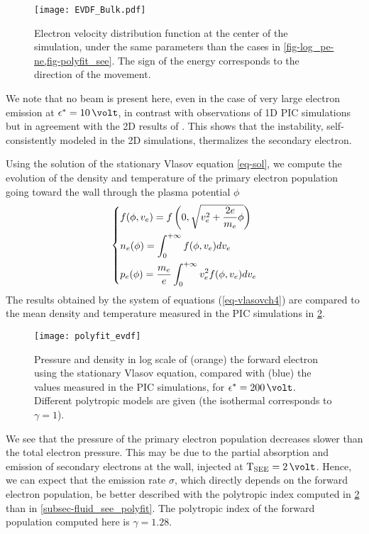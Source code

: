 \begin{figure}[hbt]
  \centering
  \texttt{[image: EVDF\_Bulk.pdf]}
  \caption{Electron velocity distribution function at the center of the simulation, under the same parameters than the cases in \cref{fig-log_pe-ne,fig-polyfit_see}. The sign of the energy corresponds to the direction of the movement.}
  \label{fig-evdf_epsstar}
\end{figure}


We note that no beam is present here, even in the case of very large electron emission at $\crover=10\,\volt$, in contrast with observations of \ac{1D} PIC simulations \citep{sydorenko2006b,sydorenko2007} but in agreement with the \ac{2D} results of \citet{heron2013}.
This shows that the instability, self-consistently modeled in the \ac{2D} simulations, thermalizes the secondary electron.

Using the solution of the stationary Vlasov equation \cref{eq-sol}, we compute the evolution of the density and temperature of the primary electron population going toward the wall through the plasma potential $\phi$ 
\begin{equation} \label{eq-vlasovch4}
  \begin{dcases}
    f(\phi, v_e) = f \left( 0, \sqrt{v_e^2 + \frac{2 e}{m_e} \phi} \right) \\
    n_e(\phi) = \int_0^{+\infty} f(\phi, v_e) dv_e \\
    p_e(\phi) = \frac{m_e}{e} \int_0^{+\infty} v_e^2 f(\phi, v_e) dv_e \\
  \end{dcases}
\end{equation}
The results obtained by the system of equations (\ref{eq-vlasovch4}) are compared to the mean density and temperature measured in the \ac{PIC} simulations in \cref{fig-evdf_polyfit}.

\begin{figure}[hbt]
  \centering
  \texttt{[image: polyfit\_evdf]}
  \caption{Pressure and density in log scale of (orange) the forward electron using the stationary Vlasov equation, compared with (blue) the values measured in the \acs{PIC} simulations, for $\crover=200\,\volt$. Different polytropic models are given (the isothermal corresponds to $\gamma=1$).}
  \label{fig-evdf_polyfit}
\end{figure}

We see that the pressure of the primary electron population decreases slower than the total electron pressure.
This may be due to the partial absorption and emission of secondary electrons at the wall, injected at $\Tsee=2\,\volt$.
Hence, we can expect that the emission rate $\sigma$, which directly depends on the forward electron population, be better described with the polytropic index computed in \cref{fig-evdf_polyfit} than in \cref{subsec-fluid_see_polyfit}.
The polytropic index of the forward population computed here is $\gamma=1.28$.

